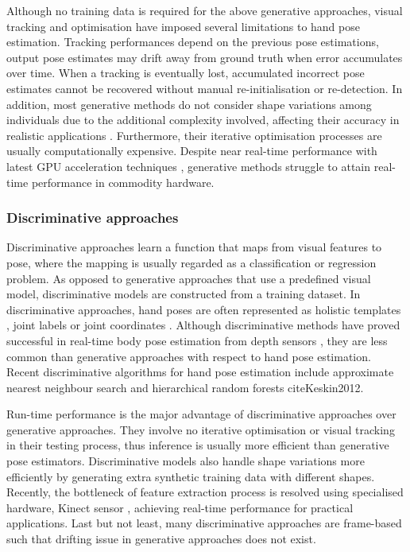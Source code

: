 Although no training data is required for the above generative approaches, visual tracking and optimisation have imposed several limitations to hand pose estimation.
Tracking performances depend on the previous pose estimations, output pose estimates may drift away from ground truth when error accumulates over time. 
When a tracking is eventually lost, accumulated incorrect pose estimates cannot be recovered without manual re-initialisation or re-detection. 
In addition, most generative methods do not consider shape variations among individuals due to the additional complexity involved, affecting their accuracy in realistic applications \cite{Erol2007}.   
Furthermore, their iterative optimisation processes are usually computationally expensive. Despite near real-time performance with latest GPU acceleration techniques \cite{Oikonomidis2011}, generative methods struggle to attain real-time performance in commodity hardware. 

\subsubsection{Discriminative approaches} 
Discriminative approaches learn a function that maps from visual features to pose, where the mapping is usually regarded as a classification or regression problem. As opposed to generative approaches that use a predefined visual model, discriminative models are constructed from a training dataset.   
In discriminative approaches, hand poses are often represented as holistic templates \cite{Wang2009}, joint labels \cite{Shotton2011} or joint coordinates \cite{Girshick2011}.
Although discriminative methods have proved successful in real-time body pose estimation from depth sensors \cite{Shotton2011, Girshick2011, Baak2011, Sun2012}, they are less common than generative approaches with respect to hand pose estimation.  
Recent discriminative algorithms for hand pose estimation include approximate nearest neighbour search \cite{Romero2009, Wang2009} and hierarchical random forests cite{Keskin2012}.  

Run-time performance is the major advantage of discriminative approaches over generative approaches. They involve no iterative optimisation or visual tracking in their testing process, thus inference is usually more efficient than generative pose estimators.  
Discriminative models also handle shape variations more efficiently by generating extra synthetic training data with different shapes. Recently, the bottleneck of feature extraction process is resolved using specialised hardware, \eg Kinect sensor \cite{Shotton2011}, achieving real-time performance for practical applications. Last but not least, many discriminative approaches are frame-based such that drifting issue in generative approaches does not exist. 

